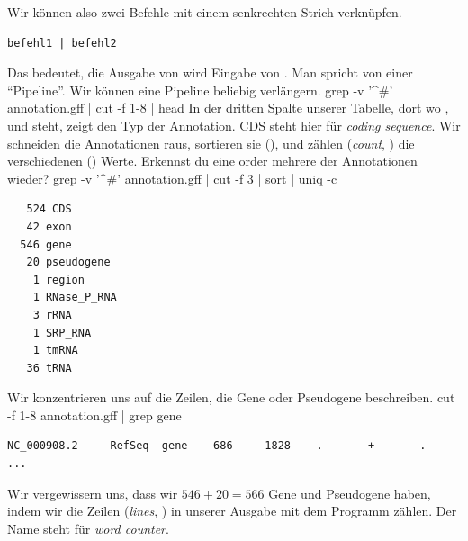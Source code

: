 Wir können also zwei Befehle mit einem senkrechten Strich verknüpfen.
\begin{verbatim}
befehl1 | befehl2
\end{verbatim}
Das bedeutet, die Ausgabe von  wird Eingabe von
. Man spricht von einer ``Pipeline''. Wir können eine
Pipeline beliebig verlängern.
\nwenddocs{}\plusendmoddef\nwstartdeflinemarkup{}\nwenddeflinemarkup
grep -v '^#' annotation.gff |
    cut -f 1-8 |
    head
\nwendcode{}\nwdocspar
In der dritten Spalte unserer Tabelle, dort wo , 
und  steht, zeigt den Typ der Annotation. CDS steht hier für
\emph{coding sequence}. Wir schneiden die Annotationen raus, sortieren
sie (), und zählen (\emph{count}, ) die verschiedenen
() Werte. Erkennst du eine order mehrere der Annotationen
wieder?
\nwenddocs{}\plusendmoddef\nwstartdeflinemarkup{}\nwenddeflinemarkup
grep -v '^#' annotation.gff |
    cut -f 3 |
    sort |
    uniq -c
\nwendcode{}\nwdocspar
\begin{verbatim}
   524 CDS
   42 exon
  546 gene
   20 pseudogene
    1 region
    1 RNase_P_RNA
    3 rRNA
    1 SRP_RNA
    1 tmRNA
   36 tRNA
\end{verbatim}
\nwenddocs{}\nwdocspar
Wir konzentrieren uns auf die Zeilen, die Gene oder Pseudogene beschreiben.
\nwenddocs{}\plusendmoddef\nwstartdeflinemarkup{}\nwenddeflinemarkup
cut -f 1-8 annotation.gff |
    grep gene
\nwendcode{}\nwdocspar
\begin{verbatim}
NC_000908.2     RefSeq  gene    686     1828    .       +       .
...
\end{verbatim}
Wir vergewissern uns, dass wir $546+20=566$ Gene und Pseudogene haben,
indem wir die Zeilen (\emph{lines}, ) in unserer Ausgabe mit
dem Programm  zählen. Der Name  steht für \emph{word
counter}.
\nwenddocs{}\plusendmoddef\nwstartdeflinemarkup{}\nwenddeflinemarkup
